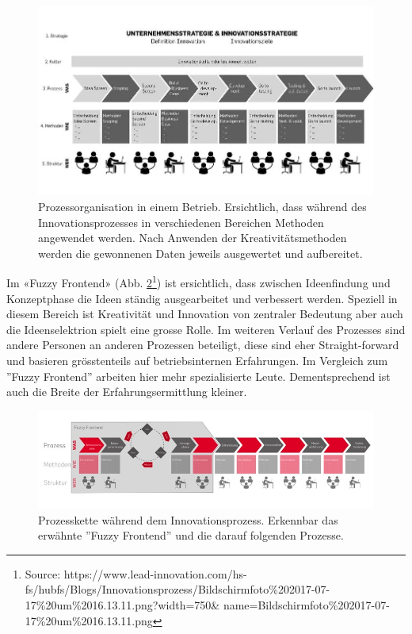 \begin{figure}[h!]
	\centering
	\includegraphics[width=\textwidth]{graphics/Grafik1}
	\caption{Prozessorganisation in einem Betrieb. Ersichtlich, dass während des Innovationsprozesses in verschiedenen Bereichen Methoden angewendet werden. Nach Anwenden der Kreativitätsmethoden werden die gewonnenen Daten jeweils ausgewertet und aufbereitet.}
	\label{fig:Grafik1}
\end{figure} 

Im «Fuzzy Frontend» (Abb. \ref{fig:Grafik2}\footnote{Source: https://www.lead-innovation.com/hs-fs/hubfs/Blogs/Innovationsprozess/Bildschirmfoto\%202017-07-17\%20um\%2016.13.11.png?width=750\& name=Bildschirmfoto\%202017-07-17\%20um\%2016.13.11.png}) ist ersichtlich, dass zwischen Ideenfindung und Konzeptphase die Ideen ständig ausgearbeitet und verbessert werden. Speziell in diesem Bereich ist Kreativität und Innovation von zentraler Bedeutung aber auch die Ideenselektrion spielt eine grosse Rolle. Im weiteren Verlauf des Prozesses sind andere Personen an anderen Prozessen beteiligt, diese sind eher Straight-forward und basieren grösstenteils auf betriebsinternen Erfahrungen. Im Vergleich zum ''Fuzzy Frontend'' arbeiten hier mehr spezialisierte Leute. Dementsprechend ist auch die Breite der Erfahrungsermittlung kleiner.

\begin{figure}[h!]
	\centering
	\includegraphics[width=\textwidth]{graphics/Grafik2}
	\caption{Prozesskette während dem Innovationsprozess. Erkennbar das erwähnte ''Fuzzy Frontend'' und die darauf folgenden Prozesse.}
	\label{fig:Grafik2}
\end{figure} 

